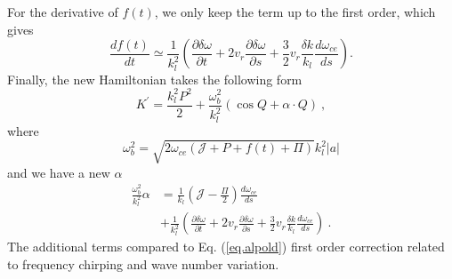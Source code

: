For the derivative of $f(t)$, we only keep the term up to the first order, which gives
\begin{equation}
    \frac{d f(t)}{d t} \simeq \frac{1}{k_l^2}(\frac{\partial \delta \omega}{\partial t} + 2 v_r \frac{\partial \delta \omega}{\partial s} + \frac{3}{2}v_r\frac{\delta k}{k_l} \frac{d \omega_{ce}}{d s}  ).
\end{equation}
Finally, the new Hamiltonian takes the following form 
\begin{equation}\label{eq.H_frame}
    K^\prime = \frac{k_l^2 P^2}{2} + \frac{\omega_b^2}{k_l^2} (\cos Q + \alpha \cdot Q)~,
\end{equation}
where
\begin{equation}
    \omega_b^2 = \sqrt{2\omega_{ce}(\mathcal{J}+P+f(t)+\Pi)} k_l^2 |a|
\end{equation}
and we have a new $\alpha$
\begin{equation}\label{eq.alpnew}
    \begin{aligned}
    \frac{\omega_b^2}{k_l^2}\alpha & = \frac{1}{k_l}\left(\mathcal{J} - \frac{\Pi}{2}\right) \frac{d\omega_{ce}}{ds} \\
    & + \frac{1}{k_l^2}\left(\frac{\partial \delta \omega}{\partial t} + 2 v_r \frac{\partial \delta \omega}{\partial s} + \frac{3}{2}v_r\frac{\delta k}{k_l} \frac{d \omega_{ce}}{d s}\right)~.
    \end{aligned}
\end{equation}
The additional terms compared to Eq. (\ref{eq.alpold}) first order correction related to frequency chirping and wave number variation.

